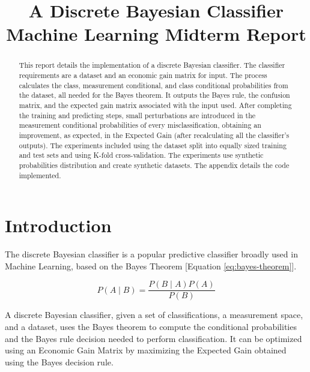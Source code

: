 \documentclass[letterpaper, conference]{IEEEtran}
\begin{document}
\title{A Discrete Bayesian Classifier \\
  \large Machine Learning Midterm Report}

\author{
}

\maketitle

\begin{abstract}

This report details the implementation of a discrete Bayesian classifier. The classifier requirements are a dataset and an economic gain matrix for input. The process calculates the class, measurement conditional, and class conditional probabilities from the dataset, all needed for the Bayes theorem. It outputs the Bayes rule, the confusion matrix, and the expected gain matrix associated with the input used. After completing the training and predicting steps, small perturbations are introduced in the measurement conditional probabilities of every misclassification, obtaining an improvement, as expected, in the Expected Gain (after recalculating all the classifier's outputs). The experiments included using the dataset split into equally sized training and test sets and using K-fold cross-validation. The experiments use synthetic probabilities distribution and create synthetic datasets. The appendix details the code implemented.

\end{abstract}

\section{Introduction}


The discrete Bayesian classifier is a popular predictive classifier broadly used in Machine Learning, based on the Bayes Theorem [Equation \ref{eq:bayes-theorem}].

\begin{equation}\label{eq:bayes-theorem}
  P(A \mid B) = \frac{P(B \mid A)\mathbin{}P(A)}{P(B)}
\end{equation}

A discrete Bayesian classifier, given a set of classifications, a measurement space, and a dataset, uses the Bayes theorem to compute the conditional probabilities and the Bayes rule decision needed to perform classification. It can be optimized using an Economic Gain Matrix by maximizing the Expected Gain obtained using the Bayes decision rule.
\end{document}

